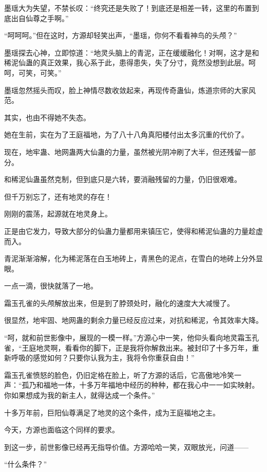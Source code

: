\begin{this_body}
墨瑶大为失望，不禁长叹：“终究还是失败了！到底还是相差一转，这里的布置到底出自仙尊之手啊。”

“呵呵呵。”但在这时，方源却轻笑出声，“墨瑶，你何不看看神鸟的头颅？”

墨瑶探去心神，立即惊道：“地灵头脑上的青泥，正在缓缓融化！对啊，这才是和稀泥仙蛊的真正效果，我心系于此，患得患失，失了分寸，竟然没想到此层。呵呵，可笑，可笑。”

墨瑶忽然摇头而叹，脸上神情尽数收敛起来，再现传奇蛊仙，炼道宗师的大家风范。

其实，也由不得她不失态。

她在生前，实在为了王庭福地，为了八十八角真阳楼付出太多沉重的代价了。

现在，地牢蛊、地网蛊两大仙蛊的力量，虽然被光阴冲刷了大半，但还残留一部分。

和稀泥仙蛊虽然克制，但到底只是六转，要消融残留的力量，仍旧很艰难。

但千万别忘了，还有地灵的存在！

刚刚的震荡，起源就在地灵身上。

正是由它发力，导致大部分的仙蛊力量都用来镇压它，使得和稀泥仙蛊的力量趁虚而入。

青泥渐渐溶解，化为稀泥落在白玉地砖上，青黑色的泥点，在雪白的地砖上分外显眼。

一点一滴，很快就落了一地。

霜玉孔雀的头颅解放出来，但是到了脖颈处时，融化的速度大大减慢了。

很显然，地牢固、地网蛊的剩余力量已经反应过来，对抗和稀泥，令其效率大降。

“呵，就和前世影像中，展现的一模一样。”方源心中一笑，他仰头看向地灵霜玉孔雀，“王庭地灵啊，看看你的脚下，正是我将你解救出来。被封印了十多万年，重新呼吸的感觉如何？只要你认我为主，我将令你重获自由！”

霜玉孔雀愤怒的脸色，仍旧定格在脸上，听了方源的话后，它高傲地冷笑一声：“孤乃和福地一体，十多万年福地中经历的种种，都在我心中一一如实映射。你如果想成为我的新主人，就得达成一个条件。”

十多万年前，巨阳仙尊满足了地灵的这个条件，成为王庭福地之主。

今天，方源也面临这个同样的要求。

到这一步，前世影像已经再无指导价值。方源哈哈一笑，双眼放光，问道——

“什么条件？”

\end{this_body}

